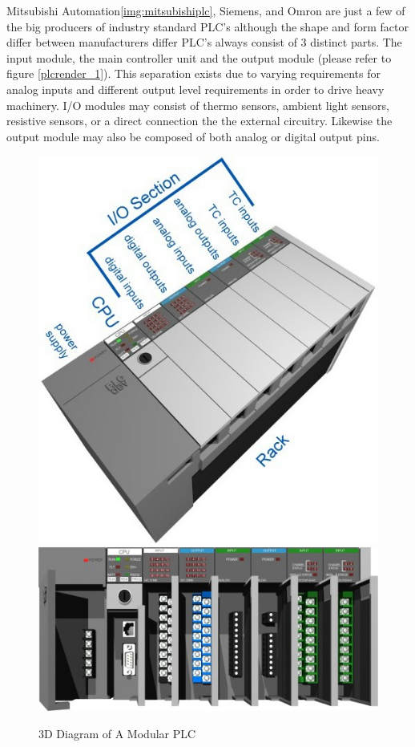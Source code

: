 Mitsubishi Automation\ref{img:mitsubishiplc}, Siemens, and Omron are just a few of the big producers of industry standard PLC's although the shape and form factor differ between manufacturers differ PLC's always consist of 3 distinct parts.  The input module, the main controller unit and the output module (please refer to figure \ref{plcrender_1}). This separation exists due to varying requirements for analog inputs and different output level requirements in order to drive heavy machinery. I/O modules may consist of thermo sensors, ambient light sensors, resistive sensors, or a direct connection the the external circuitry. Likewise the output module may also be composed of both analog or digital output pins.

\begin{figure}[htp]
    \centering
    \includegraphics[width=\imgmedphoto]{./images/c02_plcdev.jpg}
    \includegraphics[width=\imgmedphoto]{./images/c04_plcdev.jpg}
    \caption{3D Diagram of A Modular PLC \cite{img_c02_PlcDev,img_c04_PlcDev}}
    \label{img:plcrender_1}
\end{figure}


